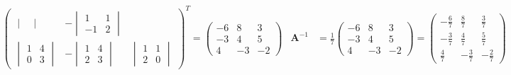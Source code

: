 \documentclass{huhtakm-template-book}
\begin{document}
\begin{eg}
\begin{align*}
\begin{pmatrix}
\begin{vmatrix}
            \end{vmatrix} & -\begin{vmatrix}
                1 & 1\\
                -1 & 2
            \end{vmatrix}\\
            \begin{vmatrix}
                1 & 4\\
                0 & 3
            \end{vmatrix} & -\begin{vmatrix}
                1 & 4\\
                2 & 3
            \end{vmatrix} & \begin{vmatrix}
                1 & 1\\
                2 & 0
            \end{vmatrix}
        \end{pmatrix}^{T}=\begin{pmatrix}
            -6 & 8 & 3\\
            -3 & 4 & 5\\
            4 & -3 & -2
        \end{pmatrix} & \mathbf{A}^{-1}&=\frac{1}{7}\begin{pmatrix}
            -6 & 8 & 3\\
            -3 & 4 & 5\\
            4 & -3 & -2
        \end{pmatrix}=\begin{pmatrix}
            -\frac{6}{7} & \frac{8}{7} & \frac{3}{7}\\
            -\frac{3}{7} & \frac{4}{7} & \frac{5}{7}\\
            \frac{4}{7} & -\frac{3}{7} & -\frac{2}{7}
        \end{pmatrix}
    \end{align*}
\end{eg}
\end{document}
